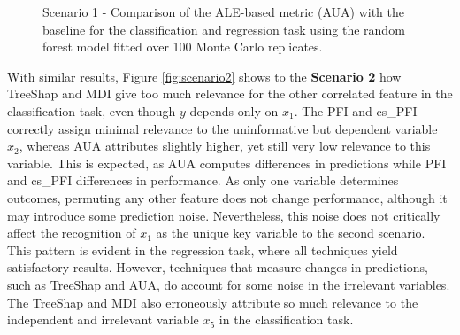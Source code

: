 \begin{figure}[ht!]
\centering
  \caption{Scenario 1 - Comparison of the ALE-based metric (AUA) with the baseline for the classification and regression task using the random forest model fitted over 100 Monte Carlo replicates.}
    \label{fig:chap5_1}
\end{figure}

With similar results, Figure \ref{fig:scenario2} shows to the \textbf{Scenario 2} how TreeShap and MDI give too much relevance for the other correlated feature in the classification task, even though \(y\) depends only on \(x_1\). The PFI and cs\_PFI correctly assign minimal relevance to the uninformative but dependent variable \(x_2\), whereas AUA attributes slightly higher, yet still very low relevance to this variable. This is expected, as AUA computes differences in predictions while PFI and cs\_PFI differences in performance. As only one variable determines outcomes, permuting any other feature does not change performance, although it may introduce some prediction noise. Nevertheless, this noise does not critically affect the recognition of \(x_1\) as the unique key variable to the second scenario. This pattern is evident in the regression task, where all techniques yield satisfactory results. However, techniques that measure changes in predictions, such as TreeShap and AUA, do account for some noise in the irrelevant variables. The TreeShap and MDI also erroneously attribute so much relevance to the independent and irrelevant variable \(x_5\) in the classification task. 

